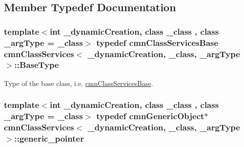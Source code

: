 \subsection{Member Typedef Documentation}
\hypertarget{classcmn_class_services_a0c7e37600cf4dfa19bc34abe57cb13ea}{
\subsubsection[{Base\-Type}]{\setlength{\rightskip}{0pt plus 5cm}template$<$int \-\_\-dynamic\-Creation, class \-\_\-class , class \-\_\-arg\-Type  = \-\_\-class$>$ typedef {\bf cmn\-Class\-Services\-Base} {\bf cmn\-Class\-Services}$<$ \-\_\-dynamic\-Creation, \-\_\-class, \-\_\-arg\-Type $>$\-::{\bf Base\-Type}}}\label{classcmn_class_services_a0c7e37600cf4dfa19bc34abe57cb13ea}
Type of the base class, i.\-e. \hyperlink{classcmn_class_services_base}{cmn\-Class\-Services\-Base}. \hypertarget{classcmn_class_services_a350752158d6ffa3f741bcef03177f230}{
\subsubsection[{generic\-\_\-pointer}]{\setlength{\rightskip}{0pt plus 5cm}template$<$int \-\_\-dynamic\-Creation, class \-\_\-class , class \-\_\-arg\-Type  = \-\_\-class$>$ typedef {\bf cmn\-Generic\-Object}$\ast$ {\bf cmn\-Class\-Services}$<$ \-\_\-dynamic\-Creation, \-\_\-class, \-\_\-arg\-Type $>$\-::{\bf generic\-\_\-pointer}}}\label{classcmn_class_services_a350752158d6ffa3f741bcef03177f230}


